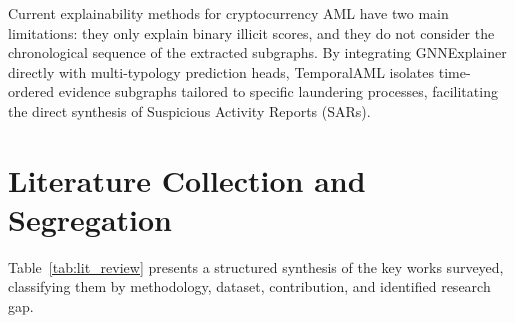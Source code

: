 Current explainability methods for cryptocurrency AML have two main limitations: they only explain binary illicit scores, and they do not consider the chronological sequence of the extracted subgraphs. By integrating GNNExplainer directly with multi-typology prediction heads, TemporalAML isolates time-ordered evidence subgraphs tailored to specific laundering processes, facilitating the direct synthesis of Suspicious Activity Reports (SARs).


\section{Literature Collection and Segregation}
\label{sec:lit_collection}

Table~\ref{tab:lit_review} presents a structured synthesis of the key works surveyed, classifying them by methodology, dataset, contribution, and identified research gap.


